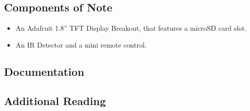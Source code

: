 \subsection*{Components of Note}

\begin{itemize}
\item An Adafruit 1.8'' TFT Display Breakout, that features a microSD card 
slot.
\item An IR Detector and a mini remote control.
\end{itemize}

\subsection*{Documentation}

\subsection*{Additional Reading}


